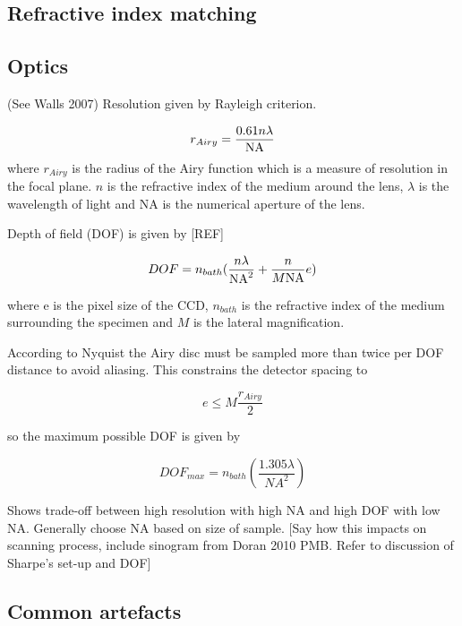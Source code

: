 \documentclass[12pt]{article}
\begin{document}
\subsection{Refractive index matching}


\subsection{Optics}

(See Walls 2007) Resolution given by Rayleigh criterion.

\begin{equation}
r_{Airy} = \dfrac{0.61n\lambda}{\rm{NA}}
\end{equation}
where $r_{Airy}$ is the radius of the Airy function which is a measure of resolution in the focal plane. $n$ is the refractive index of the medium around the lens, $\lambda$ is the wavelength of light and NA is the numerical aperture of the lens. 

Depth of field (DOF) is given by [REF]
 
\begin{equation}
DOF = n_{bath}(\dfrac{n\lambda}{\rm{NA}^{2}} + \dfrac{n}{M\rm{NA}}e)
\end{equation}

where e is the pixel size of the CCD, $n_{bath}$ is the refractive index of the medium surrounding the specimen and $M$ is the lateral magnification.

According to Nyquist the Airy disc must be sampled more than twice per DOF distance to avoid aliasing. This constrains the detector spacing to

\begin{equation}
e \leq M \dfrac{r_{Airy}}{2}
\end{equation}

so the maximum possible DOF is given by

\begin{equation}
DOF_{max} = n_{bath}(\dfrac{1.305\lambda}{NA^{2}})
\end{equation}

Shows trade-off between high resolution with high NA and high DOF with low NA. Generally choose NA based on size of sample.
[Say how this impacts on scanning process, include sinogram from Doran 2010 PMB. Refer to discussion of Sharpe's set-up and DOF]

\subsection{Common artefacts}
\end{document}
